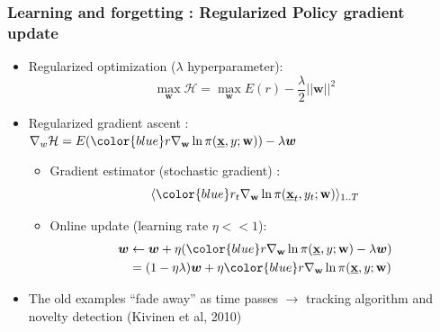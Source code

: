 \documentclass{beamer}
\begin{document}
\begin{frame}\frametitle{Learning and forgetting : Regularized Policy gradient update}
	\vspace{-.8cm}
 \begin{itemize}
  \item Regularized optimization ($\lambda$ hyperparameter):
  \vspace{-.4cm} 
  $$\max _{\boldsymbol{w}} \mathcal{H} = \max _{\boldsymbol{w}} E(r) - \frac{\lambda}{2}||\boldsymbol{w}||^2$$
  \vspace{-.4cm}
  \item Regularized gradient ascent : 
  \footnotesize{$\nabla_w \mathcal{H} = {E}({\color{blue}r\nabla_\mathbf{w}\ln\pi(\underline{\mathbf{x}},y;\mathbf{w})}) - \lambda \boldsymbol{w}$ }
  \begin{itemize}
    \item Gradient estimator (stochastic gradient) :
    \vspace{-.2cm} 
    $$
       \langle {\color{blue}r_t \nabla_\mathbf{w}\ln\pi(\underline{\mathbf{x}}_t,y_t;\mathbf{w})}\rangle_{1..T} $$
    \item Online update (learning rate $\eta << 1$):
        \vspace{-.2cm} 
    \begin{align}
      \boldsymbol{w} &\leftarrow \boldsymbol{w} + \eta ( {\color{blue}r \nabla_\mathbf{w}\ln\pi(\underline{\mathbf{x}},y;\mathbf{w})} - \lambda \boldsymbol{w}) \nonumber \\
                     &= (1 - \eta \lambda) \boldsymbol{w} + \eta {\color{blue}r \nabla_\mathbf{w}\ln\pi(\underline{\mathbf{x}},y;\mathbf{w})} \nonumber
    \end{align}
  \end{itemize}
  \vspace{-.2cm}
  \item The old examples ``fade away'' as time passes
  $\rightarrow$ tracking algorithm and novelty detection (Kivinen et al, 2010)
  \end{itemize}

\end{frame}
\end{document}
